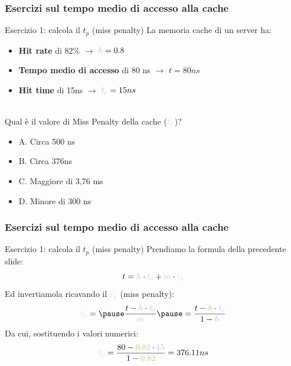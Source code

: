\begin{frame}
	\frametitle{Esercizi sul tempo medio di accesso alla cache}
	
	\begin{block}{Esercizio 1: calcola il $t_p$ (miss penalty)}
		La memoria cache di un server ha:
			\begin{itemize}
				\item \textbf{Hit rate} di 82\% \hspace{10em} $\rightarrow$ \hspace{2em} ${\color{CpuGreen}h} = 0.8$
				\item \textbf{Tempo medio di accesso} di 80 ns \hspace{2em} $\rightarrow$ \hspace{2em} $t = 80ns$
				\item \textbf{Hit time} di 15ns \hspace{9.7em} $\rightarrow$ \hspace{2em} ${\color{CpuBlue}t_c} = 15ns$
			\end{itemize}
		~\\ \pause
		Qual è il valore di Miss Penalty della cache (${\color{CpuPink}t_p}$)?
		\begin{itemize}
			\item A. Circa 500 ns
			\item B. Circa 376ns
			\item C. Maggiore di 3,76 ms
			\item D. Minore di 300 ns
		\end{itemize}
	\end{block}

\end{frame}


\begin{frame}
	\frametitle{Esercizi sul tempo medio di accesso alla cache}
	
	\begin{block}{Esercizio 1: calcola il $t_p$ (miss penalty)}
		Prendiamo la formula della precedente slide:
		$$t = {\color{CpuGreen}h} \cdot {\color{CpuBlue}t_c} + {\color{CpuRed}m} \cdot {\color{CpuPink}t_p}$$
		\pause
		Ed invertiamola ricavando il ${\color{CpuPink}t_p}$ (miss penalty):
		$${\color{CpuPink}t_p} = \pause \frac{t - {\color{CpuGreen}h} \cdot {\color{CpuBlue}t_c}}{{\color{CpuRed}m}} \pause = \frac{t - {\color{CpuGreen}h} \cdot {\color{CpuBlue}t_c}}{1 - {\color{CpuGreen}h}}$$
		\pause
		Da cui, sostituendo i valori numerici:
		\pause
		$${\color{CpuPink}t_p} = \frac{80 - {\color{CpuGreen}0.82} \cdot {\color{CpuBlue}15}}{1 - {\color{CpuGreen}0.82}} = 376.11 ns$$
	\end{block}

\end{frame}



